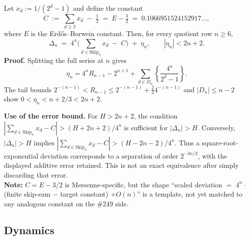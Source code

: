 \begin{thm}
\label{thm:real-form}
Let $x_d := 1/(2^d-1)$ and define the constant
\[
C \;:=\; \sum_{d \ge 2} x_d \;-\; \tfrac12 \;=\; E - \tfrac32 \;=\; 0.1066951524152917\ldots,
\]
where $E$ is the Erd\H{o}s--Borwein constant. Then, for every quotient row $n \ge 6$,
\begin{equation*}
\Delta_n \;=\; 4^n \Big( \sum_{d \in \mathrm{Skip}_n} x_d \;-\; C \Big) \;+\; \eta_n, \qquad
|\eta_n| < 2n+2.
\tag{II}
\end{equation*}
\textbf{Proof.} Splitting the full series at $n$ gives
\[
 \eta_n=4^nR_{n-1}-2^{n+1}
       +\sum_{d\in D_n}\left\{\frac{4^n}{2^d-1}\right\}.
\]
The tail bounds $2^{-(n-1)}<R_{n-1}\le
2^{-(n-1)}+\tfrac23 4^{-(n-1)}$ and $|D_n|\le n-2$ show
$0<\eta_n<n+2/3<2n+2$.

\textbf{Use of the error bound.} For $H>2n+2$, the condition
$|\sum_{d\in\mathrm{Skip}_n}x_d-C|>(H+2n+2)/4^n$ is sufficient
for $|\Delta_n|>H$.  Conversely, $|\Delta_n|>H$ implies
$|\sum_{d\in\mathrm{Skip}_n}x_d-C|>(H-2n-2)/4^n$.
Thus a square-root-exponential deviation corresponds to a separation
of order $2^{-3n/2}$, with the displayed additive error retained.
This is not an exact equivalence after simply discarding that error.\\
\textbf{Note:} $C = E - 3/2$ is Mersenne-specific, but the shape ``scaled deviation $=$
$4^n \cdot$(finite skip-sum $-$ target constant) $+ O(n)$'' is a template, not yet matched to any
analogous constant on the \#249 side.
\end{thm}

\subsection{Dynamics}

